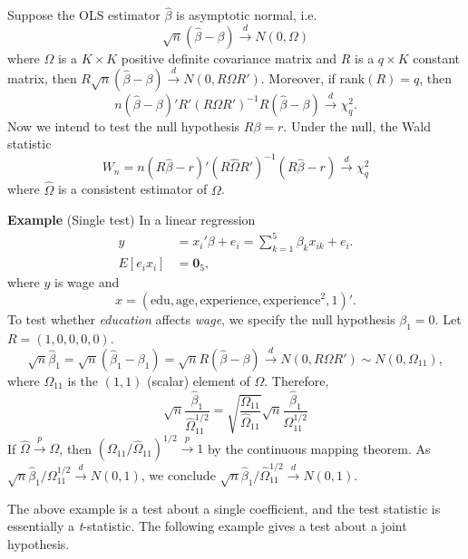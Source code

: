 \documentclass[11pt]{article}
\begin{document}
Suppose the OLS estimator \(\widehat{\beta}\) is asymptotic normal, i.e.
\[\sqrt{n}\left(\widehat{\beta}-\beta\right)\stackrel{d}{\to}N\left(0,\Omega\right)\]
where \(\Omega\) is a \(K\times K\) positive definite covariance matrix
and \(R\) is a \(q\times K\) constant matrix, then
\(R\sqrt{n}\left(\widehat{\beta}-\beta\right)\stackrel{d}{\to}N\left(0,R\Omega R'\right)\).
Moreover, if \(\mbox{rank}\left(R\right)=q\), then
\[n\left(\widehat{\beta}-\beta\right)'R'\left(R\Omega R'\right)^{-1}R\left(\widehat{\beta}-\beta\right)\stackrel{d}{\to}\chi_{q}^{2}.\]
Now we intend to test the null hypothesis \(R\beta=r\). Under the null,
the Wald statistic
\[W_{n}=n\left(R\widehat{\beta}-r\right)'\left(R\widehat{\Omega}R'\right)^{-1}\left(R\widehat{\beta}-r\right)\stackrel{d}{\to}\chi_{q}^{2}\]
where \(\widehat{\Omega}\) is a consistent estimator of \(\Omega\).

    \textbf{Example} (Single test) In a linear regression \[\begin{aligned}
y & =  x_{i}'\beta+e_{i}=\sum_{k=1}^{5}\beta_{k}x_{ik}+e_{i}.\nonumber \\
E\left[e_{i}x_{i}\right] & =  \mathbf{0}_{5},\label{eq:example}\end{aligned}
\] where \(y\) is wage and
\[x=\left(\mbox{edu},\mbox{age},\mbox{experience},\mbox{experience}^{2},1\right)'.\]
To test whether \emph{education} affects \emph{wage}, we specify the
null hypothesis \(\beta_{1}=0\). Let \(R=\left(1,0,0,0,0\right)\).
\[\sqrt{n}\widehat{\beta}_{1}=\sqrt{n}\left(\widehat{\beta}_{1}-\beta_{1}\right)=\sqrt{n}R\left(\widehat{\beta}-\beta\right)\stackrel{d}{\to}N\left(0,R\Omega R'\right)\sim N\left(0,\Omega_{11}\right),\label{eq:R11}\]
where \(\Omega{}_{11}\) is the \(\left(1,1\right)\) (scalar) element of
\(\Omega\). Therefore,
\[\sqrt{n}\frac{\widehat{\beta}_{1}}{\widehat{\Omega}_{11}^{1/2}}=\sqrt{\frac{\Omega_{11}}{\widehat{\Omega}_{11}}}\sqrt{n}\frac{\widehat{\beta}_{1}}{\Omega_{11}^{1/2}}\]
If \(\widehat{\Omega}\stackrel{p}{\to}\Omega\), then
\(\left(\Omega_{11}/\widehat{\Omega}_{11}\right)^{1/2}\stackrel{p}{\to}1\)
by the continuous mapping theorem. As
\(\sqrt{n}\widehat{\beta}_{1}/\Omega_{11}^{1/2}\stackrel{d}{\to}N\left(0,1\right)\),
we conclude
\(\sqrt{n}\widehat{\beta}_{1}/\widehat{\Omega}_{11}^{1/2}\stackrel{d}{\to}N\left(0,1\right).\)

    The above example is a test about a single coefficient, and the test
statistic is essentially a \emph{t}-statistic. The following example
gives a test about a joint hypothesis.
\end{document}
